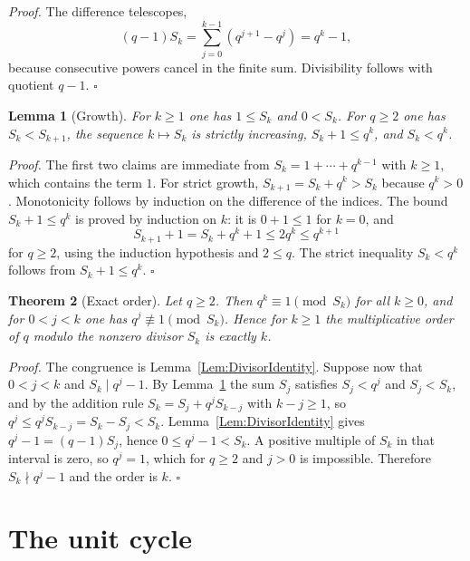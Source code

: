 \documentclass[11pt,letterpaper]{article}
\newtheorem{theorem}{Theorem}
\newtheorem{lemma}[theorem]{Lemma}
\newenvironment{proof}{\noindent\textit{Proof.}}{\hfill\(\square\)}
\begin{document}
\begin{proof}
The difference telescopes,
\[
(q-1)S_k=\sum_{j=0}^{k-1}\left(q^{j+1}-q^j\right)=q^k-1,
\]
because consecutive powers cancel in the finite sum. Divisibility follows
with quotient \(q-1\).
\end{proof}

\begin{lemma}[Growth]\label{Lem:Growth}
For \(k\ge1\) one has \(1\le S_k\) and \(0<S_k\). For \(q\ge2\) one has
\(S_k<S_{k+1}\), the sequence \(k\mapsto S_k\) is strictly increasing,
\(S_k+1\le q^k\), and \(S_k<q^k\).
\end{lemma}

\begin{proof}
The first two claims are immediate from \(S_k=1+\cdots+q^{k-1}\) with
\(k\ge1\), which contains the term \(1\). For strict growth,
\(S_{k+1}=S_k+q^k>S_k\) because \(q^k>0\). Monotonicity follows by induction
on the difference of the indices. The bound \(S_k+1\le q^k\) is proved by
induction on \(k\): it is \(0+1\le1\) for \(k=0\), and
\[
S_{k+1}+1=S_k+q^k+1\le2q^k\le q^{k+1}
\]
for \(q\ge2\), using the induction hypothesis and \(2\le q\). The strict
inequality \(S_k<q^k\) follows from \(S_k+1\le q^k\).
\end{proof}

\begin{theorem}[Exact order]\label{Thm:Order}
Let \(q\ge2\). Then \(q^k\equiv1\pmod{S_k}\) for all \(k\ge0\), and for
\(0<j<k\) one has \(q^j\not\equiv1\pmod{S_k}\). Hence for \(k\ge1\) the
multiplicative order of \(q\) modulo the nonzero divisor \(S_k\) is exactly
\(k\).
\end{theorem}

\begin{proof}
The congruence is Lemma~\ref{Lem:DivisorIdentity}. Suppose now that
\(0<j<k\) and \(S_k\mid q^j-1\). By Lemma~\ref{Lem:Growth} the sum \(S_j\)
satisfies \(S_j<q^j\) and \(S_j<S_k\), and by the addition rule
\(S_k=S_j+q^jS_{k-j}\) with \(k-j\ge1\), so \(q^j\le q^jS_{k-j}=S_k-S_j<S_k\).
Lemma~\ref{Lem:DivisorIdentity} gives \(q^j-1=(q-1)S_j\), hence
\(0\le q^j-1<S_k\). A positive multiple of \(S_k\) in that interval is zero,
so \(q^j=1\), which for \(q\ge2\) and \(j>0\) is impossible. Therefore
\(S_k\nmid q^j-1\) and the order is \(k\).
\end{proof}

\section{The unit cycle}
\end{document}
